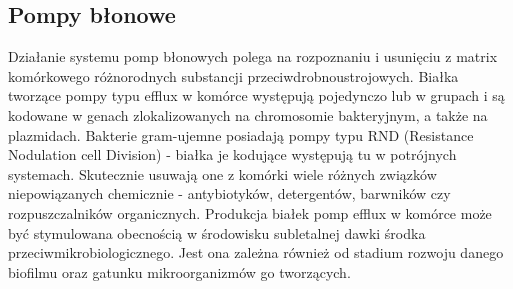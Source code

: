 \documentclass[11pt,a4paper]{report}
\begin{document}
\subsection*{Pompy błonowe}
Działanie systemu pomp błonowych polega na rozpoznaniu i usunięciu z matrix komórkowego różnorodnych substancji przeciwdrobnoustrojowych.
Białka tworzące pompy typu efflux w komórce występują pojedynczo lub w grupach i są kodowane w genach zlokalizowanych na chromosomie bakteryjnym, a także na plazmidach.
Bakterie gram-ujemne posiadają pompy  typu RND (Resistance Nodulation cell Division) - białka je kodujące występują tu w potrójnych systemach. Skutecznie usuwają one z komórki wiele różnych związków niepowiązanych chemicznie - antybiotyków, detergentów, barwników czy rozpuszczalników organicznych. Produkcja białek pomp efflux w komórce może być stymulowana obecnością w środowisku subletalnej dawki środka przeciwmikrobiologicznego. Jest ona zależna również od stadium rozwoju danego biofilmu oraz gatunku mikroorganizmów go tworzących\cite{czaczyk-myszka, wasaznik, wiercinska}.

\end{document}
